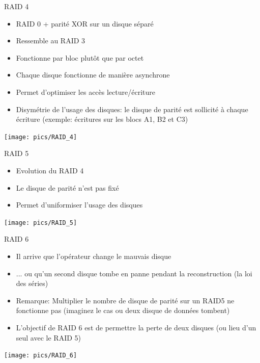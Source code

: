 \begin{frame}[fragile=singleslide]{RAID 4}
  \begin{itemize}
  \item RAID 0 + parité XOR  sur un disque séparé
  \item Ressemble au RAID 3
  \item Fonctionne par bloc plutôt que par octet
  \item Chaque disque fonctionne de manière asynchrone
  \item Permet d'optimiser les accès lecture/écriture
  \item Disymétrie  de l'usage  des disques: le  disque de  parité est
    sollicité à chaque écriture  (exemple: écritures sur les blocs A1,
    B2 et C3)
  \end{itemize}
  \begin{center}
    \texttt{[image: pics/RAID\_4]}
  \end{center}
\end{frame}

\begin{frame}[fragile=singleslide]{RAID 5}
  \begin{itemize}
  \item Evolution du RAID 4
  \item Le disque de parité n'est pas fixé
  \item Permet d'uniformiser l'usage des disques
  \end{itemize}
  \begin{center}
    \texttt{[image: pics/RAID\_5]}
  \end{center}
\end{frame}

\begin{frame}[fragile=singleslide]{RAID 6}
  \begin{itemize}
  \item Il arrive que l'opérateur change le mauvais disque
  \item  ...  ou  qu'un  second  disque  tombe  en  panne  pendant  la
    reconstruction (la loi des séries)
  \item  Remarque: Multiplier  le nombre  de disque  de parité  sur un
    RAID5 ne fonctionne pas (imaginez le cas ou deux disque de données
    tombent)
  \item L'objectif de RAID 6 est de permettre la perte de deux disques
    (ou lieu d'un seul avec le RAID 5)
  \end{itemize}
  \begin{center}
    \texttt{[image: pics/RAID\_6]}
  \end{center}
\end{frame}

